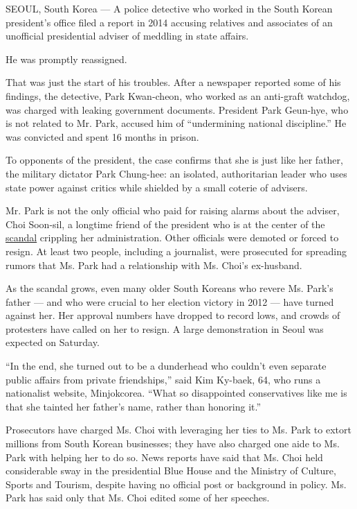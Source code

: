 SEOUL, South Korea --- A police detective who worked in the South Korean
president's office filed a report in 2014 accusing relatives and
associates of an unofficial presidential adviser of meddling in state
affairs.

He was promptly reassigned.

That was just the start of his troubles. After a newspaper reported some
of his findings, the detective, Park Kwan-cheon, who worked as an
anti-graft watchdog, was charged with leaking government documents.
President Park Geun-hye, who is not related to Mr. Park, accused him of
``undermining national discipline.'' He was convicted and spent 16
months in prison.

To opponents of the president, the case confirms that she is just like
her father, the military dictator Park Chung-hee: an isolated,
authoritarian leader who uses state power against critics while shielded
by a small coterie of advisers.

Mr. Park is not the only official who paid for raising alarms about the
adviser, Choi Soon-sil, a longtime friend of the president who is at the
center of the
\href{http://www.nytimes3xbfgragh.onion/2016/11/06/world/asia/south-koreans-ashamed-over-les-secretive-adviser.html}{scandal}
crippling her administration. Other officials were demoted or forced to
resign. At least two people, including a journalist, were prosecuted for
spreading rumors that Ms. Park had a relationship with Ms. Choi's
ex-husband.

As the scandal grows, even many older South Koreans who revere Ms.
Park's father --- and who were crucial to her election victory in 2012
--- have turned against her. Her approval numbers have dropped to record
lows, and crowds of protesters have called on her to resign. A large
demonstration in Seoul was expected on Saturday.

``In the end, she turned out to be a dunderhead who couldn't even
separate public affairs from private friendships,'' said Kim Ky-baek,
64, who runs a nationalist website, Minjokcorea. ``What so disappointed
conservatives like me is that she tainted her father's name, rather than
honoring it.''

Prosecutors have charged Ms. Choi with leveraging her ties to Ms. Park
to extort millions from South Korean businesses; they have also charged
one aide to Ms. Park with helping her to do so. News reports have said
that Ms. Choi held considerable sway in the presidential Blue House and
the Ministry of Culture, Sports and Tourism, despite having no official
post or background in policy. Ms. Park has said only that Ms. Choi
edited some of her speeches.

